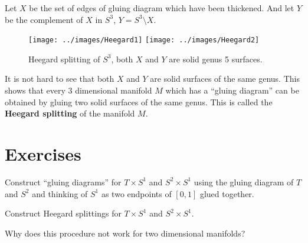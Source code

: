 Let $X$ be the set of edges of gluing diagram which have been thickened. And let $Y$ be the complement of $X$ in $S^3$, $Y = S^3 \setminus X$.
\begin{figure}[H]
	\centering
	\texttt{[image: ../images/Heegard1]}
	\texttt{[image: ../images/Heegard2]}
	\caption{Heegard splitting of $S^3$, both $X$ and $Y$ are solid genus 5 surfaces.}
\end{figure}

It is not hard to see that both $X$ and $Y$ are solid surfaces of the same genus. This shows that every 3 dimensional manifold $M$ which has a ``gluing diagram'' can be obtained by gluing two solid surfaces of the same genus. This is called the \textbf{Heegard splitting} of the manifold $M$.

\section{Exercises}

\begin{exercise}
	Construct ``gluing diagrams'' for $T \times S^1$ and $S^2 \times S^1	$ using the gluing diagram of $T$ and $S^2$ and thinking of $S^1$ as two endpoints of $[0,1]$ glued together.
\end{exercise}

\begin{exercise}
	Construct Heegard splittings for $T \times S^1$ and $S^2 \times S^1$.
\end{exercise}

\begin{exercise}
	Why does this procedure not work for two dimensional manifolds?
\end{exercise}




